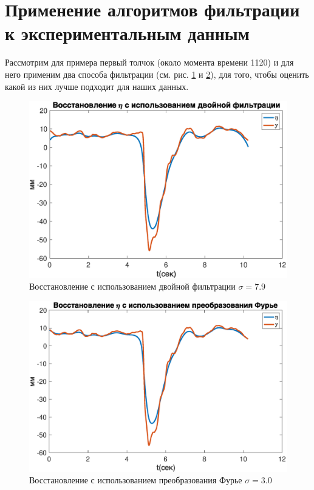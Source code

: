 \documentclass[a4paper,12pt, openany]{book}
\theoremstyle{plain} %
\theoremstyle{definition} %
\theoremstyle{remark} %
\numberwithin{equation}{chapter}
\begin{document}
{\section{Применение алгоритмов фильтрации к экспериментальным данным}
Рассмотрим для примера первый толчок (около момента времени 1120) и для него применим два способа
фильтрации (см. рис. \ref{restore_double_real} и \ref{restore_fur_real}), для того, 
чтобы оценить какой из них лучше подходит для наших данных.

\begin{figure}[h!]
    \centering
    \includegraphics[width=0.9\linewidth]{restore_eta_double_real.eps}
    \caption{Восстановление с использованием двойной фильтрации $\sigma=7.9$}
    \label{restore_double_real}
\end{figure}

\begin{figure}[h!]
    \centering
    \includegraphics[width=0.9\linewidth]{restore_eta_fur_real.eps}
    \caption{Восстановление с использованием преобразования Фурье $\sigma=3.0$}
    \label{restore_fur_real}
\end{figure}

}
\end{document}
